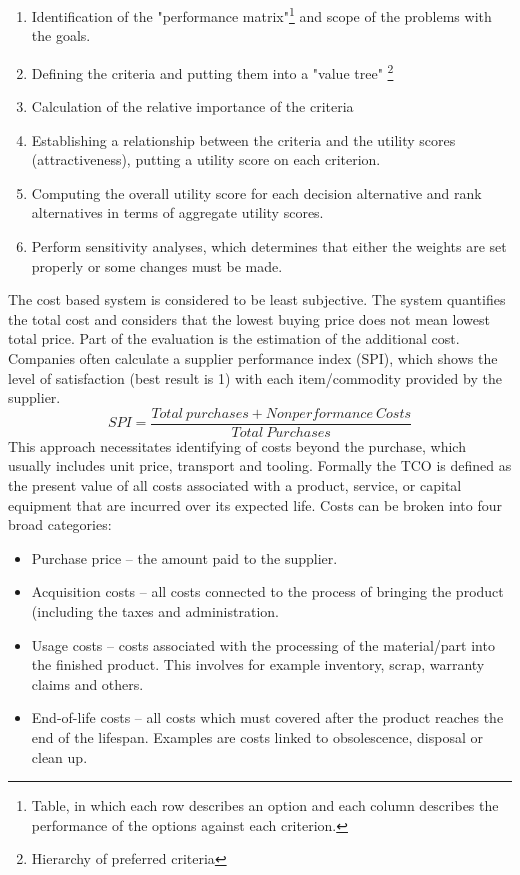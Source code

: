 \documentclass[oneside,12pt]{article}%
\begin{document}
\begin{enumerate}
  \item Identification of the "performance matrix"\footnote{Table, in which each row describes an option and each column describes the performance of the options against each criterion.} and scope of the problems with the goals.
  \item Defining the criteria and putting them into a "value tree" \footnote{Hierarchy of preferred criteria}
  \item Calculation of the relative importance of the criteria
  \item Establishing a relationship between the criteria and the utility scores (attractiveness), putting a utility score on each criterion.
  \item Computing the overall utility score for each decision alternative and rank alternatives in terms of aggregate utility scores.
  \item Perform sensitivity analyses, which determines that either the weights are set properly or some changes must be made.
\end{enumerate}


The cost based system is considered to be least subjective. The system quantifies the total cost and considers that the lowest buying price does not mean lowest total price. Part of the evaluation is the estimation of the additional cost. Companies often calculate a supplier performance index (SPI), which shows the level of satisfaction (best result is 1) with each item/commodity provided by the supplier.
\newline
$$SPI = \frac{Total \: purchases + Nonperformance \: Costs}{Total \: Purchases}$$
\newline
This approach necessitates identifying of costs beyond the purchase, which usually includes unit price, transport and tooling. Formally the TCO is defined as the present value of all costs associated with a product, service, or capital equipment that are incurred over its expected life. Costs can be broken into four broad categories:


\begin{itemize}
\item Purchase price – the amount paid to the supplier.
\item Acquisition costs – all costs connected to the process of bringing the product (including the taxes and administration.
\item Usage costs – costs associated with the processing of the material/part into the finished product. This involves for example inventory, scrap, warranty claims and others.
\item End-of-life costs – all costs which must covered after the product reaches the end of the lifespan. Examples are costs linked to obsolescence, disposal or clean up.
\end{itemize}
\end{document}
